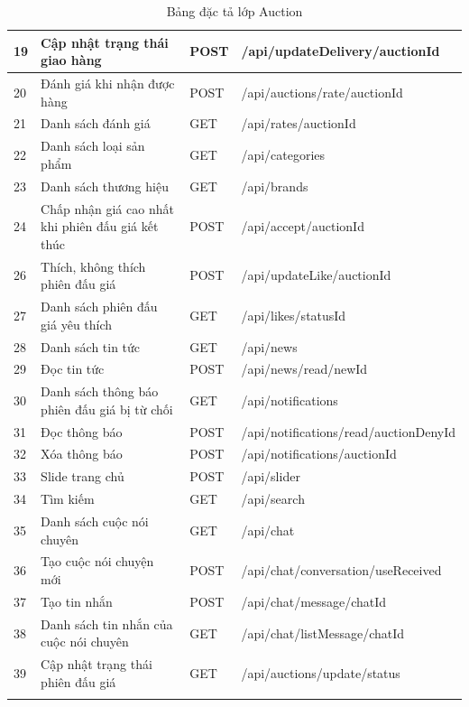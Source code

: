 \documentclass{article}
\begin{document}
\begin{longtable}{| p{} | p{} | p{} | p{} |}
        19 & Cập nhật trạng thái giao hàng & POST & /api/updateDelivery/{auctionId}\\\hline
        20 & Đánh giá khi nhận được hàng & POST & /api/auctions/rate/{auctionId}\\\hline
        21 & Danh sách đánh giá & GET & /api/rates/{auctionId}\\\hline
        22 & Danh sách loại sản phẩm & GET & /api/categories\\\hline
        23 & Danh sách thương hiệu & GET & /api/brands\\\hline
        24 & Chấp nhận giá cao nhất khi phiên đấu giá kết thúc & POST & /api/accept/{auctionId}\\\hline
        26 & Thích, không thích phiên đấu giá & POST & /api/updateLike/{auctionId}\\\hline
        27 & Danh sách phiên đấu giá yêu thích & GET & /api/likes/{statusId}\\\hline
        28 & Danh sách tin tức & GET & /api/news\\\hline
        29 & Đọc tin tức & POST & /api/news/read/{newId}\\\hline
        30 & Danh sách thông báo phiên đấu giá bị từ chối & GET& /api/notifications \\\hline
        31 & Đọc thông báo & POST& /api/notifications/read/{auctionDenyId}\\\hline
        32 & Xóa thông báo& POST & /api/notifications/{auctionId}\\\hline
        33 & Slide trang chủ& POST& /api/slider\\\hline
        34 & Tìm kiếm& GET& /api/search\\\hline
        35 & Danh sách cuộc nói chuyên & GET & /api/chat\\\hline
        36 & Tạo cuộc nói chuyện mới & POST & /api/chat/conversation/{useReceived}\\\hline
        37 & Tạo tin nhắn& POST& /api/chat/message/{chatId}\\\hline
        38 & Danh sách tin nhắn của cuộc nói chuyên & GET&  /api/chat/listMessage/{chatId}\\\hline
        39 & Cập nhật trạng thái phiên đấu giá & GET & /api/auctions/update/status\\\hline
    \caption{Bảng đặc tả lớp Auction}
    \label{bang46}
    \end{longtable}
\end{document}
